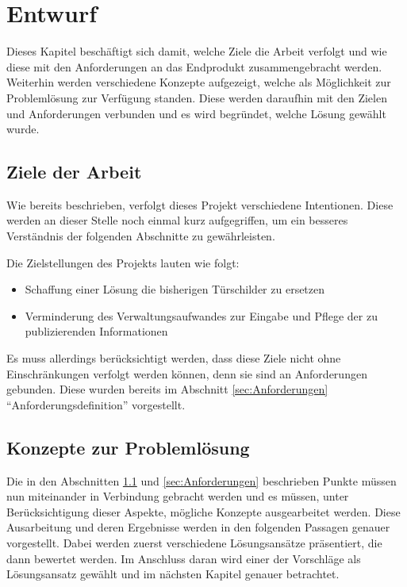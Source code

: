 \chapter{ Entwurf }\label{chap:Entwurf}
\vspace{-3cm}
\begin{flushleft}
Dieses Kapitel beschäftigt sich damit, welche Ziele die Arbeit verfolgt und wie diese mit den Anforderungen an das Endprodukt zusammengebracht werden. Weiterhin werden verschiedene Konzepte aufgezeigt, welche als Möglichkeit zur Problemlösung zur Verfügung standen. Diese werden daraufhin mit den Zielen und Anforderungen verbunden und es wird begründet, welche Lösung gewählt wurde.

\section{Ziele der Arbeit}\label{sec:Ziele der Arbeit}
Wie bereits beschrieben, verfolgt dieses Projekt verschiedene Intentionen. Diese werden an dieser Stelle noch einmal kurz aufgegriffen, um ein besseres Verständnis der folgenden Abschnitte zu gewährleisten.
\newline

Die Zielstellungen des Projekts lauten wie folgt:
\begin{itemize}
  \item Schaffung einer Lösung die bisherigen Türschilder zu ersetzen
  \item Verminderung des Verwaltungsaufwandes zur Eingabe und Pflege der zu publizierenden Informationen
\end{itemize}

Es muss allerdings berücksichtigt werden, dass diese Ziele nicht ohne Einschränkungen verfolgt werden können, denn sie sind an Anforderungen gebunden. Diese wurden bereits im Abschnitt \ref{sec:Anforderungen} ``Anforderungsdefinition'' vorgestellt.

\section{Konzepte zur Problemlösung}
Die in den Abschnitten \ref{sec:Ziele der Arbeit} und \ref{sec:Anforderungen} beschrieben Punkte müssen nun miteinander in Verbindung gebracht werden und es müssen, unter Berücksichtigung dieser Aspekte, mögliche Konzepte ausgearbeitet werden.
Diese Ausarbeitung und deren Ergebnisse werden in den folgenden Passagen genauer vorgestellt. Dabei werden zuerst verschiedene Lösungsansätze präsentiert, die dann bewertet werden. Im Anschluss daran wird einer der Vorschläge als Lösungsansatz gewählt und im nächsten Kapitel genauer betrachtet.


\end{flushleft}
